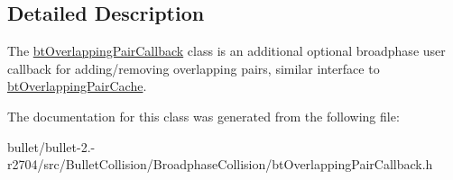 \subsection{Detailed Description}
The \hyperlink{classbt_overlapping_pair_callback}{bt\+Overlapping\+Pair\+Callback} class is an additional optional broadphase user callback for adding/removing overlapping pairs, similar interface to \hyperlink{classbt_overlapping_pair_cache}{bt\+Overlapping\+Pair\+Cache}. 

The documentation for this class was generated from the following file\+:\begin{DoxyCompactItemize}
\item 
bullet/bullet-\/2.-\/r2704/src/\+Bullet\+Collision/\+Broadphase\+Collision/bt\+Overlapping\+Pair\+Callback.\+h\end{DoxyCompactItemize}
